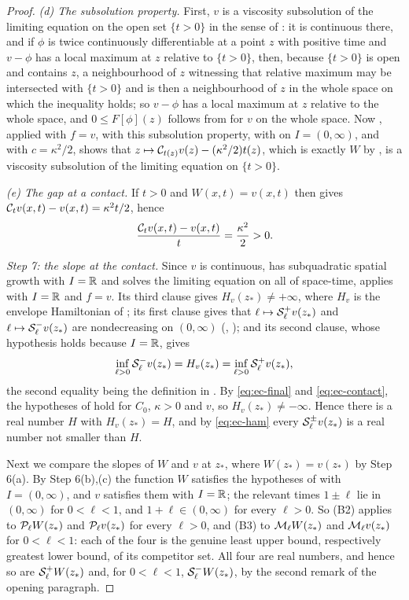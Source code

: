 \begin{proof}
\emph{(d) The subsolution property.} First, $v$ is a viscosity subsolution of
the limiting equation on the open set $\{t>0\}$ in the sense of
: it is continuous there, and if $\phi$ is twice
continuously differentiable at a point $z$ with positive time and $v-\phi$ has a
local maximum at $z$ relative to $\{t>0\}$, then, because $\{t>0\}$ is open and
contains $z$, a neighbourhood of $z$ witnessing that relative maximum may be
intersected with $\{t>0\}$ and is then a neighbourhood of $z$ in the whole
space on which the inequality holds; so $v-\phi$ has a local maximum at $z$
relative to the whole space, and $0\le F[\phi](z)$ follows from
 for $v$ on the whole space. Now
, applied with $f=v$, with this subsolution
property, with  on $I=(0,\infty)$, and with
$c=\kappa^2/2$, shows that
$z\mapsto\mathcal{C}_{t(z)}v(z)-(\kappa^2/2)t(z)$, which is exactly $W$ by
, is a viscosity subsolution of the limiting equation on
$\{t>0\}$.

\emph{(e) The gap at a contact.} If $t>0$ and $W(x,t)=v(x,t)$ then
 gives $\mathcal{C}_tv(x,t)-v(x,t)=\kappa^2t/2$, hence
\[
  \frac{\mathcal{C}_tv(x,t)-v(x,t)}{t}=\frac{\kappa^2}{2}>0 .
\]

\emph{Step 7: the slope at the contact.}
Since $v$ is continuous, has subquadratic spatial growth with $I=\mathbb{R}$ and solves
the limiting equation on all of space-time, 
applies with $I=\mathbb{R}$ and $f=v$. Its third clause gives $H_v(z_*)\ne+\infty$,
where $H_v$ is the envelope Hamiltonian of ; its first
clause gives that $\ell\mapsto\mathcal{S}_\ell^+v(z_*)$ and
$\ell\mapsto\mathcal{S}_\ell^-v(z_*)$ are nondecreasing on $(0,\infty)$
(, ); and its second clause, whose
hypothesis holds because $I=\mathbb{R}$, gives
\begin{equation}\label{eq:ec-ham}
  \inf_{\ell>0}\mathcal{S}_\ell^-v(z_*)=H_v(z_*)
   =\inf_{\ell>0}\mathcal{S}_\ell^+v(z_*),
\end{equation}
the second equality being the definition in .
By \eqref{eq:ec-final} and \eqref{eq:ec-contact}, the hypotheses of
 hold for $C_0$, $\kappa>0$ and $v$, so
$H_v(z_*)\ne-\infty$. Hence there is a real number $H$ with $H_v(z_*)=H$, and by
\eqref{eq:ec-ham} every $\mathcal{S}_\ell^\pm v(z_*)$ is a real number not smaller
than $H$.

Next we compare the slopes of $W$ and $v$ at $z_*$, where $W(z_*)=v(z_*)$ by
Step 6(a). By Step 6(b),(c) the function $W$ satisfies the hypotheses of
 with $I=(0,\infty)$, and $v$ satisfies them
with $I=\mathbb{R}$; the relevant times $1\pm\ell$ lie in $(0,\infty)$ for $0<\ell<1$,
and $1+\ell\in(0,\infty)$ for every $\ell>0$. So (B2) applies to
$\mathcal{P}_\ell W(z_*)$ and $\mathcal{P}_\ell v(z_*)$ for every $\ell>0$, and (B3) to
$\mathcal{M}_\ell W(z_*)$ and $\mathcal{M}_\ell v(z_*)$ for $0<\ell<1$: each of the four is
the genuine least upper bound, respectively greatest lower bound, of its
competitor set. All four are real numbers, and hence so are
$\mathcal{S}_\ell^+W(z_*)$ and, for $0<\ell<1$, $\mathcal{S}_\ell^-W(z_*)$, by the second
remark of the opening paragraph.


\end{proof}
